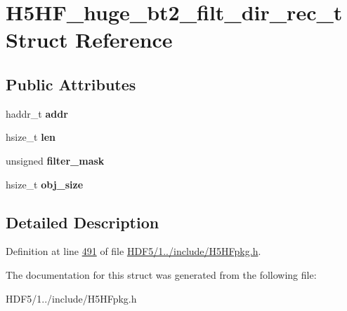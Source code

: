 \hypertarget{struct_h5_h_f__huge__bt2__filt__dir__rec__t}{}\section{H5\+H\+F\+\_\+huge\+\_\+bt2\+\_\+filt\+\_\+dir\+\_\+rec\+\_\+t Struct Reference}
\label{struct_h5_h_f__huge__bt2__filt__dir__rec__t}
\subsection*{Public Attributes}
\begin{DoxyCompactItemize}
\item 
\mbox{\label{struct_h5_h_f__huge__bt2__filt__dir__rec__t_a82b76002a4215d8674d53b77f11abacb}} 
haddr\+\_\+t {\bfseries addr}
\item 
\mbox{\label{struct_h5_h_f__huge__bt2__filt__dir__rec__t_a1375c4c8980dfcc5e48f60cb5ed17e8d}} 
hsize\+\_\+t {\bfseries len}
\item 
\mbox{\label{struct_h5_h_f__huge__bt2__filt__dir__rec__t_a452f65ffbd32ac2f1f424e370238d4f1}} 
unsigned {\bfseries filter\+\_\+mask}
\item 
\mbox{\label{struct_h5_h_f__huge__bt2__filt__dir__rec__t_af1ca7ff3fa160ed24ae2415fbe65d38f}} 
hsize\+\_\+t {\bfseries obj\+\_\+size}
\end{DoxyCompactItemize}


\subsection{Detailed Description}


Definition at line \hyperlink{_h_d_f5_21_810_81_2include_2_h5_h_fpkg_8h_source_l00491}{491} of file \hyperlink{_h_d_f5_21_810_81_2include_2_h5_h_fpkg_8h_source}{H\+D\+F5/1../include/\+H5\+H\+Fpkg.\+h}.



The documentation for this struct was generated from the following file\+:\begin{DoxyCompactItemize}
\item 
H\+D\+F5/1../include/\+H5\+H\+Fpkg.\+h\end{DoxyCompactItemize}
